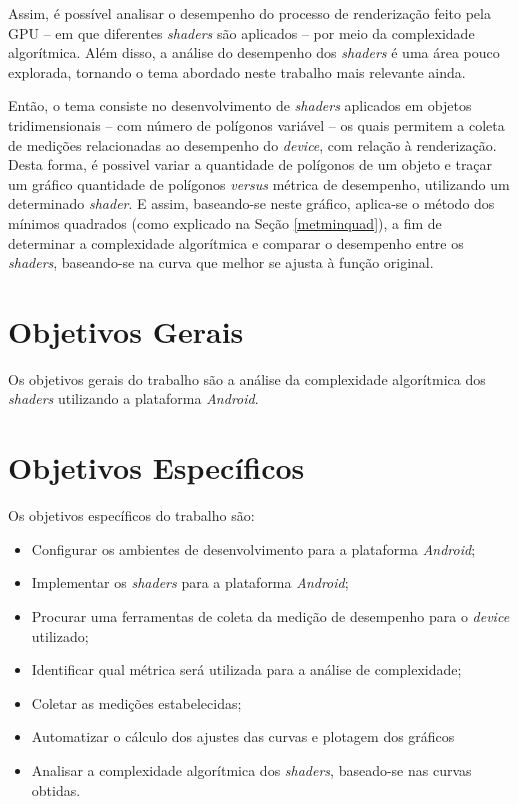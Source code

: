 	Assim, é possível analisar o desempenho do processo de renderização feito pela GPU -- em que diferentes \textit{shaders} são aplicados -- por meio da complexidade algorítmica. Além disso, a análise do desempenho dos \textit{shaders} é uma área pouco explorada, tornando o tema abordado neste trabalho mais relevante ainda. 

	Então, o tema consiste no desenvolvimento de \textit{shaders} aplicados em objetos tridimensionais -- com número de polígonos variável -- os quais permitem a coleta de medições relacionadas ao desempenho do \textit{device}, com relação à renderização. Desta forma, é possivel variar a quantidade de polígonos de um objeto e traçar um gráfico quantidade de polígonos \textit{versus} métrica de desempenho, utilizando um determinado \textit{shader}. E assim, baseando-se neste gráfico, aplica-se o método dos mínimos quadrados (como explicado na Seção \ref{metminquad}), a fim de determinar a complexidade algorítmica e comparar o desempenho entre os \textit{shaders}, baseando-se na curva que melhor se ajusta à função original.  

\section{Objetivos Gerais}

Os objetivos gerais do trabalho são a análise da complexidade algorítmica dos \textit{shaders} utilizando a plataforma \textit{Android}.

\section{Objetivos Específicos}

Os objetivos específicos do trabalho são:

\begin{itemize}
 \item Configurar os ambientes de desenvolvimento para a plataforma \textit{Android};
 \item Implementar os \textit{shaders} para a plataforma \textit{Android};
\item Procurar uma ferramentas de coleta da medição de desempenho para o \textit{device} utilizado;
\item Identificar qual métrica será utilizada para a análise de complexidade;
\item Coletar as medições estabelecidas;
\item Automatizar o cálculo dos ajustes das curvas e plotagem dos gráficos
\item Analisar a complexidade algorítmica dos \textit{shaders}, baseado-se nas curvas obtidas.
\end{itemize}

